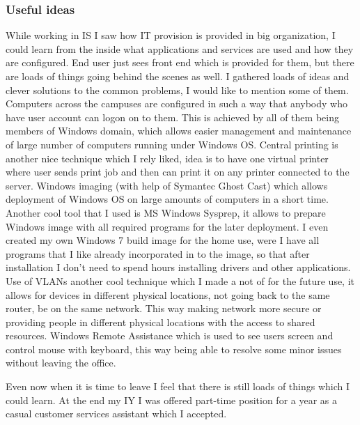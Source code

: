 \documentclass[10pt,a4paper,headinclude=true,twoside]{report}
\begin{document}
\subsubsection{Useful ideas}
While working in IS I saw how IT provision is provided in big organization, I could learn from the inside what applications and services are used and how they are configured. End user just sees front end which is provided for them, but there are loads of things going behind the scenes as well. I gathered loads of ideas and clever solutions to the common problems, I would like to mention some of them. Computers across the campuses are configured in such a way that anybody who have user account can logon on to them. This is achieved by all of them being members of Windows domain, which allows easier management and maintenance of large number of computers running under Windows OS. Central printing is another nice technique which I rely liked, idea is to have one virtual printer where user sends print job and then can print it on any printer connected to the server. Windows imaging (with help of Symantec Ghost Cast) which allows deployment of Windows OS on large amounts of computers in a short time. Another cool tool that I used is MS Windows Sysprep, it allows to prepare Windows image with all required programs for the later deployment. I even created my own Windows 7 build image for the home use, were I have all programs that I like already incorporated in to the image, so that after installation I don't need to spend hours installing drivers and other applications. Use of VLANs another cool technique which I made a not of for the future use, it allows for devices in different physical locations, not going back to the same router, be on the same network. This way making network more secure or providing people in different physical locations with the access to shared resources. Windows Remote Assistance which is used to see users screen and control mouse with keyboard, this way being able to resolve some minor issues without leaving the office.

Even now when it is time to leave I feel that there is still loads of things which I could learn. At the end my IY I was offered part-time position for a year as a casual customer services assistant which I accepted. 



\end{document}

